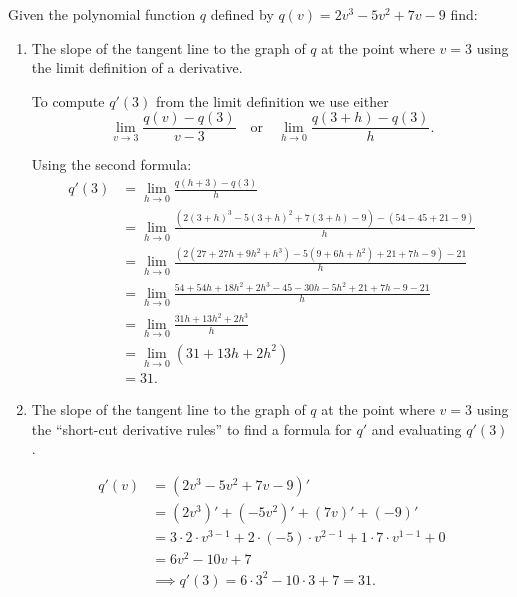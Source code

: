 \documentclass[nooutcomes,handout]{ximera}
\begin{document}
\begin{problem}
  Given the polynomial function $q$ defined by $q(v) = 2v^3 - 5v^2 + 7v - 9$ find:
  \begin{enumerate}

    \item
      The slope of the tangent line to the graph of $q$ at the point where $v = 3$ using the limit definition of a derivative.
      \begin{freeResponse}
        To compute $q'(3)$ from the limit definition we use either 
        \[
          \lim_{v \to 3} \frac{q(v)-q(3)}{v-3} \quad \text{or} \quad \lim_{h \to 0} \frac{q(3+h)-q(3)}{h}.
        \]

        
        Using the second formula:
        \begin{align*}
          q'(3) &= \lim_{h \to 0} \frac{q(h+3)-q(3)}{h} \\
          &= \lim_{h \to 0} \frac{(2(3+h)^3 - 5(3+h)^2 + 7(3+h) - 9) - (54 - 45 + 21 - 9)}{h}\\
          &= \lim_{h \to 0} \frac{(2(27+27h+9h^2+h^3) - 5(9+6h+h^2) + 21+7h - 9) - 21}{h} \\
          &= \lim_{h \to 0} \frac{54+54h+18h^2+2h^3-45-30h-5h^2+21+7h-9-21}{h} \\
          &= \lim_{h \to 0} \frac{31h+13h^2+2h^3}{h} \\
          &= \lim_{h \to 0} (31+13h+2h^2)\\
          &= 31.
        \end{align*}
      \end{freeResponse}


    \item

      The slope of the tangent line to the graph of $q$ at the point where $v = 3$ using the ``short-cut derivative rules'' to find a formula for $q'$ and evaluating $q'(3)$.
      \begin{freeResponse} \hfil

        \begin{align*}
          q'(v) &= (2v^3 - 5v^2 + 7v - 9)'\\
          &= (2v^3)' + (-5v^2)' + (7v)' + (-9)' \\
          &= 3\cdot 2 \cdot v^{3-1} + 2\cdot (-5)\cdot v^{2-1} + 1\cdot 7\cdot v^{1-1} + 0 \\
          &= 6v^2 - 10v + 7\\
          &\implies q'(3) = 6\cdot3^2 - 10\cdot3 + 7 = 31.
        \end{align*}
      \end{freeResponse}



\end{enumerate}
\end{problem}
\end{document}
